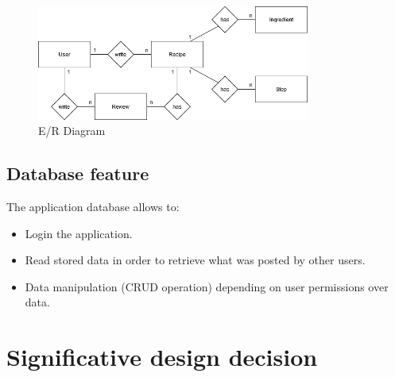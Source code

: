	\begin{figure}[H]
		\begin{center}
			\centering
			\includegraphics[width=0.8\textwidth]{img/ERDiagram.png}
			\caption{E/R Diagram}
			\label{Fig:ERDiagram}
		\end{center}
	\end{figure}

	\subsection{Database feature}
	The application database allows to:
	
	\begin{itemize}
		\item Login the application.
		\item Read stored data in order to retrieve what was posted by other users.
		\item Data manipulation (CRUD operation) depending on user permissions over data.
	\end{itemize}
	
	
\section{Significative design decision}
